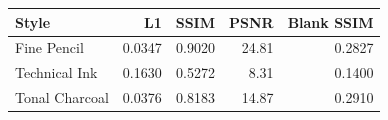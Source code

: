 \begin{tabular}{lrrrr}\toprule Style & L1 & SSIM & PSNR & Blank SSIM\\\midrule
Fine Pencil & 0.0347 & 0.9020 & 24.81 & 0.2827\\
Technical Ink & 0.1630 & 0.5272 & 8.31 & 0.1400\\
Tonal Charcoal & 0.0376 & 0.8183 & 14.87 & 0.2910\\
\bottomrule\end{tabular}
